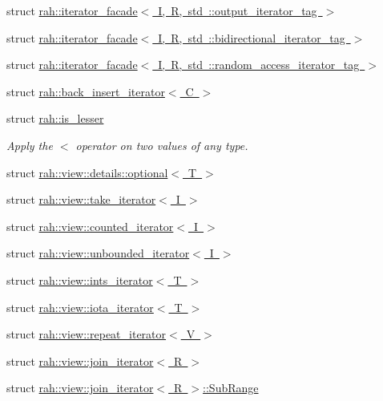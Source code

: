 \begin{DoxyCompactItemize}
\item 
struct \mbox{\hyperlink{structrah_1_1iterator__facade_3_01_i_00_01_r_00_01std_01_1_1output__iterator__tag_01_4}{rah\+::iterator\+\_\+facade$<$ I, R, std \+::output\+\_\+iterator\+\_\+tag $>$}}
\item 
struct \mbox{\hyperlink{structrah_1_1iterator__facade_3_01_i_00_01_r_00_01std_01_1_1bidirectional__iterator__tag_01_4}{rah\+::iterator\+\_\+facade$<$ I, R, std \+::bidirectional\+\_\+iterator\+\_\+tag $>$}}
\item 
struct \mbox{\hyperlink{structrah_1_1iterator__facade_3_01_i_00_01_r_00_01std_01_1_1random__access__iterator__tag_01_4}{rah\+::iterator\+\_\+facade$<$ I, R, std \+::random\+\_\+access\+\_\+iterator\+\_\+tag $>$}}
\item 
struct \mbox{\hyperlink{structrah_1_1back__insert__iterator}{rah\+::back\+\_\+insert\+\_\+iterator$<$ C $>$}}
\item 
struct \mbox{\hyperlink{structrah_1_1is__lesser}{rah\+::is\+\_\+lesser}}
\begin{DoxyCompactList}\small\item\em Apply the \textquotesingle{}$<$\textquotesingle{} operator on two values of any type. \end{DoxyCompactList}\item 
struct \mbox{\hyperlink{structrah_1_1view_1_1details_1_1optional}{rah\+::view\+::details\+::optional$<$ T $>$}}
\item 
struct \mbox{\hyperlink{structrah_1_1view_1_1take__iterator}{rah\+::view\+::take\+\_\+iterator$<$ I $>$}}
\item 
struct \mbox{\hyperlink{structrah_1_1view_1_1counted__iterator}{rah\+::view\+::counted\+\_\+iterator$<$ I $>$}}
\item 
struct \mbox{\hyperlink{structrah_1_1view_1_1unbounded__iterator}{rah\+::view\+::unbounded\+\_\+iterator$<$ I $>$}}
\item 
struct \mbox{\hyperlink{structrah_1_1view_1_1ints__iterator}{rah\+::view\+::ints\+\_\+iterator$<$ T $>$}}
\item 
struct \mbox{\hyperlink{structrah_1_1view_1_1iota__iterator}{rah\+::view\+::iota\+\_\+iterator$<$ T $>$}}
\item 
struct \mbox{\hyperlink{structrah_1_1view_1_1repeat__iterator}{rah\+::view\+::repeat\+\_\+iterator$<$ V $>$}}
\item 
struct \mbox{\hyperlink{structrah_1_1view_1_1join__iterator}{rah\+::view\+::join\+\_\+iterator$<$ R $>$}}
\item 
struct \mbox{\hyperlink{structrah_1_1view_1_1join__iterator_1_1_sub_range}{rah\+::view\+::join\+\_\+iterator$<$ R $>$\+::\+Sub\+Range}}

\end{DoxyCompactItemize}
